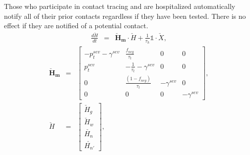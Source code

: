 \documentclass[notitlepage, superscriptaddress]{revtex4-2}
\begin{document}
Those who participate in contact tracing and are hospitalized automatically notify all of their prior contacts regardless if they have been tested. There is no effect if they are notified of a potential contact.
\begin{eqnarray}
\frac{d\check{H}}{dt} &=& \boldsymbol{\check{H}_{m}} \cdot \check{H} + \frac{1}{\tau_{h}} \mathbb{1} \cdot  \check{X}, 
\end{eqnarray}
%
\begin{eqnarray}
\boldsymbol{\check{H}_{m}} &=&
\begin{bmatrix}
 - p^{sev}_{t} - \gamma^{sev} & \frac{f_{neg}}{\tau_{t}}  & 0 & 0 \\
p^{sev}_{t}  & -\frac{1}{\tau_{t}} - \gamma^{sev}      &  0    & 0  \\
 0 & \frac{(1-f_{neg})}{\tau_{t}}  & - \gamma^{sev}  & 0 \\ 
0 & 0 & 0 & - \gamma^{sev}
\end{bmatrix}, \\ 
%
\check{H} &=& 
\begin{bmatrix}
\check{H}_{g} \\  \check{H}_{w}\\ \check{H_{n}} \\ \check{H_{n'}}
\end{bmatrix}, \\ 
%
\end{eqnarray}
% 
\end{document}
